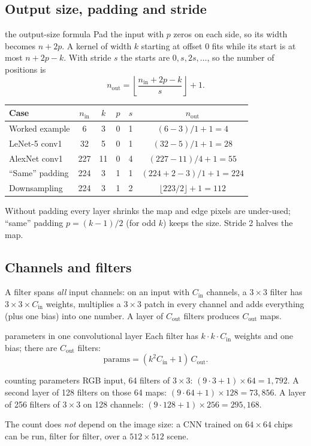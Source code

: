 \documentclass[11pt]{article}
\begin{document}
\subsection{Output size, padding and stride}
\begin{derivation}{the output-size formula}
Pad the input with $p$ zeros on each side, so its width becomes $n+2p$. A kernel of width $k$ starting at offset $0$ fits while its start is at most $n+2p-k$. With stride $s$ the starts are $0,s,2s,\dots$, so the number of positions is
\[n_{\text{out}}=\left\lfloor\frac{n_{\text{in}}+2p-k}{s}\right\rfloor+1.\]
\end{derivation}
\begin{center}\small\renewcommand{\arraystretch}{1.25}
\begin{tabular}{lccccc}\toprule
\textbf{Case} & $n_{\text{in}}$ & $k$ & $p$ & $s$ & $n_{\text{out}}$\\\midrule
Worked example & 6 & 3 & 0 & 1 & $(6-3)/1+1=4$\\
LeNet-5 conv1 & 32 & 5 & 0 & 1 & $(32-5)/1+1=28$\\
AlexNet conv1 & 227 & 11 & 0 & 4 & $(227-11)/4+1=55$\\
``Same'' padding & 224 & 3 & 1 & 1 & $(224+2-3)/1+1=224$\\
Downsampling & 224 & 3 & 1 & 2 & $\lfloor223/2\rfloor+1=112$\\\bottomrule
\end{tabular}\end{center}
Without padding every layer shrinks the map and edge pixels are under-used; ``same'' padding $p=(k-1)/2$ (for odd $k$) keeps the size. Stride 2 halves the map.

\subsection{Channels and filters}
A filter spans \emph{all} input channels: on an input with $C_{\text{in}}$ channels, a $3\times3$ filter has $3\times3\times C_{\text{in}}$ weights, multiplies a $3\times3$ patch in every channel and adds everything (plus one bias) into one number. A layer of $C_{\text{out}}$ filters produces $C_{\text{out}}$ maps.
\begin{derivation}{parameters in one convolutional layer}
Each filter has $k\cdot k\cdot C_{\text{in}}$ weights and one bias; there are $C_{\text{out}}$ filters:
\[\text{params}=(k^2C_{\text{in}}+1)\,C_{\text{out}}.\]
\end{derivation}
\begin{example}{counting parameters}
RGB input, 64 filters of $3\times3$: $(9\cdot3+1)\times64=1{,}792$. A second layer of 128 filters on those 64 maps: $(9\cdot64+1)\times128=73{,}856$. A layer of 256 filters of $3\times3$ on 128 channels: $(9\cdot128+1)\times256=295{,}168$.
\end{example}
The count does \emph{not} depend on the image size: a CNN trained on $64\times64$ chips can be run, filter for filter, over a $512\times512$ scene.
\end{document}

